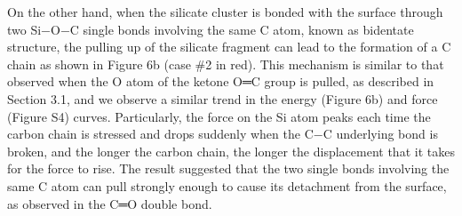\documentclass{article}
\begin{document}
On the other hand, when the silicate cluster is bonded with the surface through two Si−O−C single bonds involving the same C atom, known as bidentate structure, the pulling up of the silicate fragment can lead to the formation of a C chain as shown in Figure 6b (case \#2 in red). This mechanism is similar to that observed when the O atom of the ketone O═C group is pulled, as described in Section 3.1, and we observe a similar trend in the energy (Figure 6b) and force (Figure S4) curves. Particularly, the force on the Si atom peaks each time the carbon chain is stressed and drops suddenly when the C−C underlying bond is broken, and the longer the carbon chain, the longer the displacement that it takes for the force to rise. The result suggested that the two single bonds involving the same C atom can pull strongly enough to cause its detachment from the surface, as observed in the C═O double bond.
\end{document}
